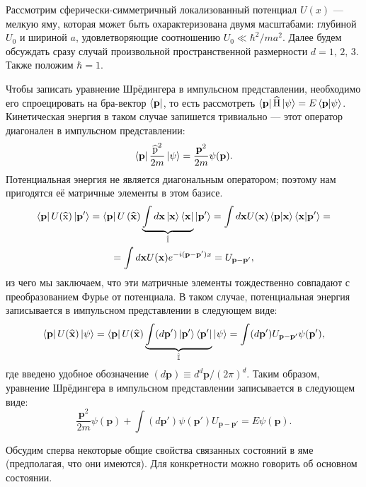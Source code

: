 \documentclass[a4paper]{article}
\begin{document}
\begin{sol}
	Рассмотрим сферически-симметричный локализованный потенциал $U(x)$ 
--- мелкую яму, которая может быть охарактеризована двумя масштабами:
глубиной $U_0$ и шириной $a$, удовлетворяющие соотношению
$U_0 \ll \hbar^2 /ma^2$. Далее будем обсуждать сразу случай
произвольной пространственной размерности $d=1,\,2,\,3.$ Также
положим $\hbar=1$.

Чтобы записать уравнение Шрёдингера в импульсном представлении,
необходимо его спроецировать на бра-вектор $\bra{\mathbf{p}}$, то есть
рассмотреть $\bra{\mathbf{p}}\widehat{\operatorname{H}}\ket{\psi}=
 E \braket{\mathbf{p}|\psi}$. Кинетическая энергия
 в таком случае запишется тривиально --- этот оператор
диагонален в импульсном представлении:
\[
	\bra{\mathbf{p}} \frac{\widehat{\operatorname{p}}^2}{
	2m}\ket{\psi}= \frac{\mathbf{p}^2}{2m}\psi(\mathbf{p})
.\] 
Потенциальная энергия не является диагональным оператором;
поэтому нам пригодятся её матричные элементы в этом базисе.
\begin{multline*}
	\bra{\mathbf{p}}U(\widehat{\operatorname{x}})\ket{\mathbf{p}'}= \bra{\mathbf{p}}U\left(\widehat{\operatorname{\mathbf{x}}}\right) \underbrace{\int d\mathbf{x} \ket{\mathbf{x}}\bra{\mathbf{x}}}_{\hat{\operatorname{\mathbb{I}}}}\ket{\mathbf{p}'}=
	\int d \mathbf{x} U(\mathbf{x}) \braket{\mathbf{p}|\mathbf{x}}\braket{\mathbf{x}|\mathbf{p}'}=\\=
	\int d\mathbf{x} U(\mathbf{x}) e^{-i (\mathbf{p}-\mathbf{p}')x}= U_{\mathbf{p}-\mathbf{p}'}
,\end{multline*} 
из чего мы заключаем, что эти матричные элементы тождественно
совпадают с преобразованием Фурье от потенциала. В таком
случае, потенциальная энергия записывается в импульсном
представлении в следующем виде:
\[
	\bra{\mathbf{p}}U(\widehat{\operatorname{\mathbf{x}}})
	\ket{\psi}= \bra{\mathbf{p}}U(\widehat{\operatorname{\mathbf{x}}}) \underbrace{\int (d \mathbf{p}') \ket{\mathbf{p}'}
	\bra{\mathbf{p}'}}_{\hat{\operatorname{\mathbb{I}}}}
	\ket{\psi}= \int (d \mathbf{p}') U_{\mathbf{p}-\mathbf{p}'}\psi(\mathbf{p}')
 ,\]
 где введено удобное обозначение $(d \mathbf{p})\equiv
 d^d \mathbf{p} /(2\pi)^d$. Таким образом, уравнение
Шрёдингера в импульсном представлении записывается в следующем
виде:
\[
	\frac{\mathbf{p}^2}{2m}\psi(\mathbf{p})+ \int
	(d\mathbf{p}')\psi(\mathbf{p}')U_{\mathbf{p}-\mathbf{p}'}
	= E \psi(\mathbf{p})
.\] 

Обсудим сперва некоторые общие свойства связанных состояний
в яме (предполагая, что они имеются). Для конкретности можно
говорить об основном состоянии.


\end{sol}
\end{document}
